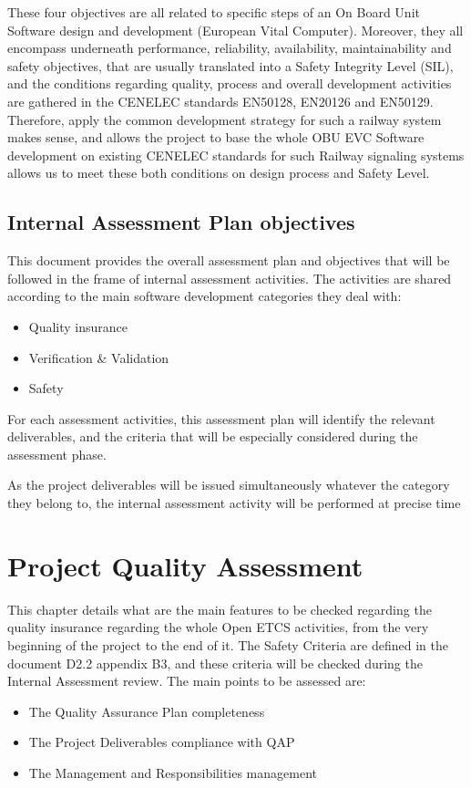 \documentclass{template/openetcs_article}
\begin{document}
These four objectives are all related to specific steps of an On Board Unit Software design and development (European Vital Computer). Moreover, they all encompass underneath performance, reliability, availability, maintainability and safety objectives, that are usually translated into a Safety Integrity Level (SIL), and the conditions regarding quality, process and overall development activities are gathered in the CENELEC standards EN50128, EN20126 and EN50129.
Therefore, apply the common development strategy for such a railway system makes sense, and allows the project to base the whole OBU EVC Software development on existing CENELEC standards for such Railway signaling systems allows us to meet these both conditions on design process and Safety Level.

\subsection{Internal Assessment Plan objectives}
This document provides the overall assessment plan and objectives that will be followed in the frame of internal assessment activities.
The activities are shared according to the main software development categories they deal with:
\begin{itemize}
\item Quality insurance
\item Verification \& Validation
\item Safety
\end{itemize}

For each assessment activities, this assessment plan will identify the relevant deliverables, and the criteria that will be especially considered during the assessment phase.

As the project deliverables will be issued simultaneously whatever the category they belong to, the internal assessment activity will be performed at precise time

\section{Project Quality Assessment}
This chapter details what are the main features to be checked regarding the quality insurance regarding the whole Open ETCS activities, from the very beginning of the project to the end of it.
The Safety Criteria are defined in the document D2.2 appendix B3, and these criteria will be checked during the Internal Assessment review. The main points to be assessed are:
\begin{itemize}
\item The Quality Assurance Plan completeness
\item The Project Deliverables compliance with QAP
\item The Management and Responsibilities management 
\end{itemize}
\end{document}
